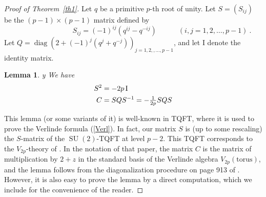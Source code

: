 \documentclass{amsart}
\newtheorem{lem}[thm]{Lemma}
\begin{document}
\begin{proof}[Proof of Theorem~\ref{th1}] Let $q$ be a primitive
  $p$-th root of unity. Let $S=(S_{ij})$ be the
$(p-1)\times (p-1)$  matrix
  defined by
 \begin{equation*} \qquad \qquad \qquad \qquad S_{ij}=(-1)^{ij} (q^{ij}-q^{-ij}) \qquad \quad (i,j=1,2, \ldots, p-1)~.\end{equation*}
Let
   $Q=\operatorname{diag}(2+(-1)^j(q^j+q^{-j}))_{j=1,2,,\ldots,p-1}$, and let  ${{\mathrm I}}$
   denote the identity
  matrix. 

\begin{lem}{\label{{lem4}}{
	 y
	\fi
}} We have 
\begin{align}{\label{{MZ1}}{
	\if{n} y
		\smash{\makebox[0pt]{\hspace{-0.5in}
			\raisebox{8pt}{\tt\tiny {{MZ1}}}}}
	\fi
}} S^2&=- {2p} \,{{\mathrm I}}\\
{\label{{MZ}}{
	\if{n} y
		\smash{\makebox[0pt]{\hspace{-0.5in}
			\raisebox{8pt}{\tt\tiny {{MZ}}}}}
	\fi
}} 
C&= S Q S^{-1}= - \textstyle {\frac{1}{2p}} S Q S 
\end{align} 
\end{lem}
\vskip 8pt

This lemma (or some variants of it) is well-known in TQFT,
where it is used to
    prove the Verlinde formula (\ref{Verl}). In fact, our matrix $S$ is
    (up to some rescaling) the $S$-matrix of  the $\operatorname{SU}(2)$-TQFT at
    level  $p-2$. This TQFT corresponds to the $V_{2p}$-theory of
    \cite{BHMV2}. In the notation of that paper, the matrix $C$ is the
    matrix of multiplication  by $2+z$ in the standard basis of the
    Verlinde algebra $V_{2p}(\mathrm{torus})$, and the lemma
    follows from the diagonalization procedure on page 913 of
    \cite{BHMV2}. However, it is 
also
easy to prove the lemma by a direct
    computation, which  we include for the convenience of the
    reader.  


\end{proof}
\end{document}
